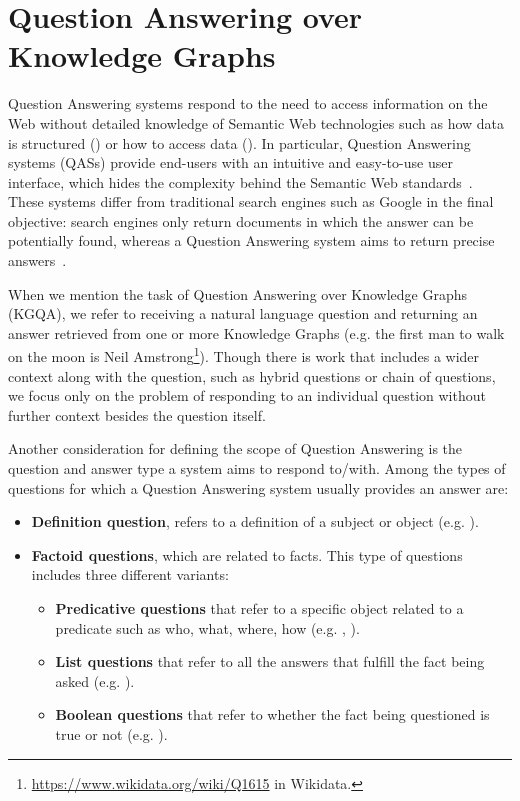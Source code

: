 \section{Question Answering over Knowledge Graphs}
\label{cap2:theoFrame/qakg}
Question Answering systems respond to the need to access information on the Web without 
detailed knowledge of Semantic Web technologies such as how data is structured (\RDF{}) or how to 
access data (\SPARQL{}). In particular, Question Answering systems (QASs) provide end-users with an 
intuitive and easy-to-use user interface, which hides the complexity behind the Semantic Web 
standards~\cite{qa:intro-UngerFC14}. These systems differ from traditional search engines such 
as Google in the final objective: search engines only return documents in which the answer can be 
potentially found, whereas a Question Answering system aims to return precise answers~\cite{qa:LopezUSM11}.

When we mention the task of Question Answering over Knowledge Graphs (KGQA), we refer to 
receiving a natural language question and returning an answer retrieved from one or more 
Knowledge Graphs (e.g. the first man to walk on the moon is Neil 
Amstrong\footnote{\url{https://www.wikidata.org/wiki/Q1615} in Wikidata.}). Though there is work 
that includes a wider context along with the question, such as hybrid questions or chain of 
questions, we focus only on the problem of responding to an individual question without further 
context besides the question itself.

Another consideration for defining the scope of Question Answering is the question and answer 
type a system aims to respond to/with. Among the types of questions for which a Question 
Answering system usually provides an answer are:

\begin{itemize}
    \item \textbf{Definition question}, refers to a definition of a subject or object (e.g. 
    ).
    \item \textbf{Factoid questions}, which are related to facts. This type of questions 
    includes three different variants:
    \begin{itemize}
        \item \textbf{Predicative questions} that refer to a specific object related to a predicate 
        such as who, what, where, how (e.g. , 
        ).
        \item \textbf{List questions} that refer to all the answers that fulfill the fact being 
        asked (e.g. ).
        \item \textbf{Boolean questions} that refer to whether the fact being questioned is true 
        or not (e.g. ).
    \end{itemize}
\end{itemize}

